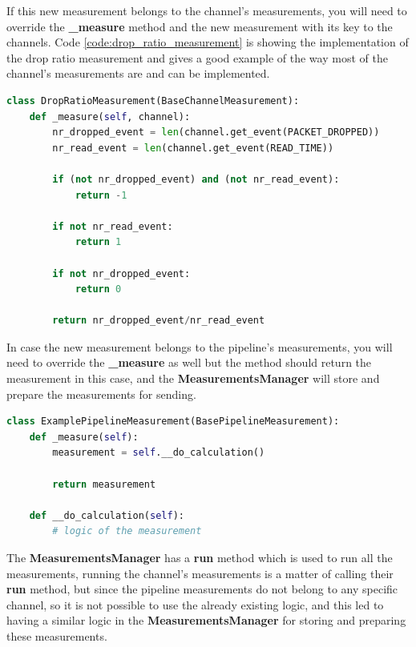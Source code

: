 If this new measurement belongs to the channel's measurements, you will need to override the \textbf{\_measure}
method and the new measurement with its key to the channels. Code \ref{code:drop_ratio_measurement} is showing
the implementation of the drop ratio measurement and gives a good example of the way most of the channel's measurements
are and can be implemented.
\newline
\begin{lstlisting}[language=Python, label={code:drop_ratio_measurement}, caption={Drop ratio measurement},captionpos=b]
class DropRatioMeasurement(BaseChannelMeasurement):
    def _measure(self, channel):
        nr_dropped_event = len(channel.get_event(PACKET_DROPPED))
        nr_read_event = len(channel.get_event(READ_TIME))

        if (not nr_dropped_event) and (not nr_read_event):
            return -1

        if not nr_read_event:
            return 1

        if not nr_dropped_event:
            return 0

        return nr_dropped_event/nr_read_event
\end{lstlisting}

In case the new measurement belongs to the pipeline's measurements, you will need to override the \textbf{\_measure}
as well but the method should return the measurement in this case, and the \textbf{MeasurementsManager} will
store and prepare the measurements for sending.
\newline
\begin{lstlisting}[language=Python, caption={Pipeline's measurement example},captionpos=b]
class ExamplePipelineMeasurement(BasePipelineMeasurement):
	def _measure(self):
		measurement = self.__do_calculation()

		return measurement

	def __do_calculation(self):
		# logic of the measurement
\end{lstlisting}

The \textbf{MeasurementsManager} has a \textbf{run} method which is used to run all the measurements, 
running the channel's measurements is a matter of calling their \textbf{run} method, but since the pipeline measurements do not belong to any specific channel, so it is not possible to use the already
existing logic, and this led to having a similar logic in the \textbf{MeasurementsManager} for
storing and preparing these measurements.

